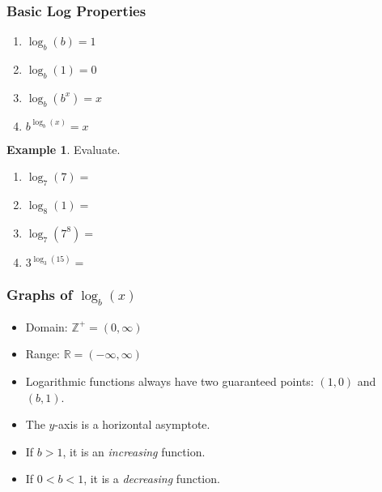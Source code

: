 \documentclass[addpoints,12pt]{exam}
\theoremstyle{definition}
\theoremstyle{break}
\theoremstyle{break}
\newtheorem{example}{Example}[subsection]
\begin{document}
\subsubsection*{Basic Log Properties}
\begin{enumerate}
\item $\log_b{(b)} = 1$
\vspace{.1in}
\item $\log_b{(1)} = 0$
\vspace{.1in}
\item $\log_b{\left(b^x\right)} = x$
\vspace{.1in}
\item $b^{\log_b{(x)}} = x$
\end{enumerate}

\newpage

\begin{example}
Evaluate.
\begin{enumerate}
\item $\log_{7}{\left(7\right)} = $
\vspace{.25in}
\item $\log_{8}{\left(1\right)} = $
\vspace{.25in}
\item $\log_{7}{\left(7^8\right)} = $
\vspace{.25in}
\item $3^{\log_{3}{\left(15\right)}} = $
\vspace{.25in}
\end{enumerate}
\end{example}

\subsubsection*{Graphs of $\log_b{(x)}$}
\vspace{2in}
\begin{itemize}
\item Domain: $\mathbb{Z}^+ = (0,\infty)$
\item Range: $\mathbb{R} = (-\infty,\infty)$
\item Logarithmic functions always have two guaranteed points: $(1,0)$ and $(b,1)$.
\item The $y$-axis is a horizontal asymptote.
\item If $b>1$, it is an \emph{increasing} function.
\item If $0 < b < 1$, it is a \emph{decreasing} function.
\end{itemize}
\end{document}

